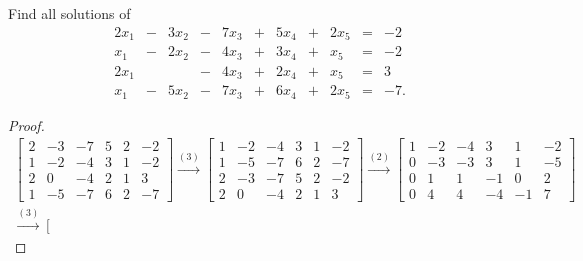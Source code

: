 \begin{exercise}
    Find all solutions of
    \[
        \begin{array}{ccccccccccc}
            2{x_{1}} & - & 3{x_{2}} & - & 7{x_{3}} & + & 5{x_{4}} & + & 2{x_{5}} & = & -2  \\
            x_{1}    & - & 2{x_{2}} & - & 4{x_{3}} & + & 3{x_{4}} & + & x_{5}    & = & -2  \\
            2{x_{1}} &   &          & - & 4{x_{3}} & + & 2{x_{4}} & + & x_{5}    & = & 3   \\
            x_{1}    & - & 5{x_{2}} & - & 7{x_{3}} & + & 6{x_{4}} & + & 2{x_{5}} & = & -7.
        \end{array}
    \]
\end{exercise}

\begin{proof}
    \begingroup{}
    \allowdisplaybreaks{}
    \begin{align*}
        \left[\begin{array}{ccccc|c}
                      2 & -3 & -7 & 5 & 2 & -2 \\
                      1 & -2 & -4 & 3 & 1 & -2 \\
                      2 & 0  & -4 & 2 & 1 & 3  \\
                      1 & -5 & -7 & 6 & 2 & -7
                  \end{array}\right]
        \stackrel{(3)}{\rightarrow}
        \left[\begin{array}{ccccc|c}
                      1 & -2 & -4 & 3 & 1 & -2 \\
                      1 & -5 & -7 & 6 & 2 & -7 \\
                      2 & -3 & -7 & 5 & 2 & -2 \\
                      2 & 0  & -4 & 2 & 1 & 3
                  \end{array}\right]
        \stackrel{(2)}{\rightarrow}
        \left[\begin{array}{ccccc|c}
                      1 & -2 & -4 & 3  & 1  & -2 \\
                      0 & -3 & -3 & 3  & 1  & -5 \\
                      0 & 1  & 1  & -1 & 0  & 2  \\
                      0 & 4  & 4  & -4 & -1 & 7
                  \end{array}\right] \\
        \stackrel{(3)}{\rightarrow}
        \left[\begin{array}{ccccc|c}

\end{array}
\end{align*}
\end{proof}
